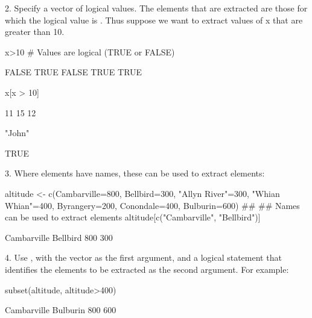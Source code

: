 2. Specify a vector of logical values.    The elements that are
  extracted are those for which the logical value is .
  Thus suppose we want to extract values of x that are greater than
  10.
\begin{Schunk}
\begin{Sinput}
x>10   # Values are logical (TRUE or FALSE)
\end{Sinput}
\begin{Soutput}
[1] FALSE  TRUE FALSE  TRUE  TRUE
\end{Soutput}
\begin{Sinput}
x[x > 10]
\end{Sinput}
\begin{Soutput}
[1] 11 15 12
\end{Soutput}
\begin{Sinput}
"John" %
\end{Sinput}
\begin{Soutput}
[1] TRUE
\end{Soutput}
\end{Schunk}

3. Where elements have names, these can be used to extract elements:
\begin{Schunk}
\begin{Sinput}
altitude <- c(Cambarville=800, Bellbird=300,
              "Allyn River"=300,
              "Whian Whian"=400,
              Byrangery=200, Conondale=400,
              Bulburin=600)
##
## Names can be used to extract elements
altitude[c("Cambarville", "Bellbird")]
\end{Sinput}
\begin{Soutput}
Cambarville    Bellbird 
        800         300 
\end{Soutput}
\end{Schunk}

4. Use , with the vector as the first argument,
and a logical statement that identifies the elements to be
extracted as the second argument. For example:
\begin{Schunk}
\begin{Sinput}
subset(altitude, altitude>400)
\end{Sinput}
\begin{Soutput}
Cambarville    Bulburin 
        800         600 
\end{Soutput}
\end{Schunk}

